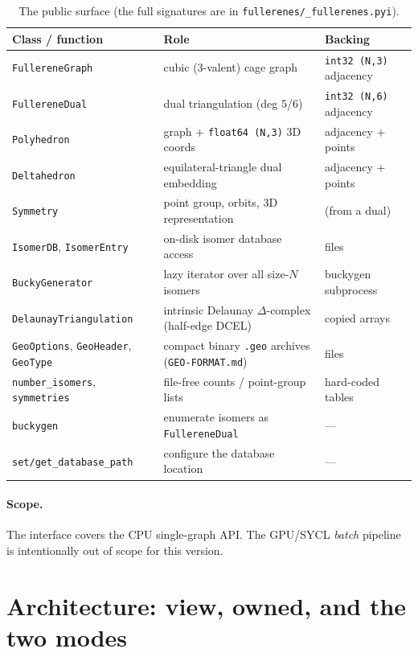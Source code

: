 \documentclass[11pt]{article}
\begin{document}
\begin{table}[h]
\centering\small
\begin{tabular}{@{}lll@{}}
\toprule
Class / function & Role & Backing \\
\midrule
\texttt{FullereneGraph}  & cubic ($3$-valent) cage graph         & \texttt{int32 (N,3)} adjacency \\
\texttt{FullereneDual}   & dual triangulation (deg $5$/$6$)      & \texttt{int32 (N,6)} adjacency \\
\texttt{Polyhedron}      & graph $+$ \texttt{float64 (N,3)} 3D coords & adjacency $+$ points \\
\texttt{Deltahedron}     & equilateral-triangle dual embedding   & adjacency $+$ points \\
\texttt{Symmetry}        & point group, orbits, $3$D representation & (from a dual) \\
\texttt{IsomerDB}, \texttt{IsomerEntry} & on-disk isomer database access & files \\
\texttt{BuckyGenerator}  & lazy iterator over all size-$N$ isomers & buckygen subprocess \\
\texttt{DelaunayTriangulation} & intrinsic Delaunay $\Delta$-complex (half-edge DCEL) & copied arrays \\
\texttt{GeoOptions}, \texttt{GeoHeader}, \texttt{GeoType} & compact binary \texttt{.geo} archives (\texttt{GEO-FORMAT.md}) & files \\
\addlinespace
\texttt{number\_isomers}, \texttt{symmetries} & file-free counts / point-group lists & hard-coded tables \\
\texttt{buckygen}        & enumerate isomers as \texttt{FullereneDual} & --- \\
\texttt{set/get\_database\_path} & configure the database location & --- \\
\bottomrule
\end{tabular}
\caption{The public surface (the full signatures are in \texttt{fullerenes/\_fullerenes.pyi}).}
\label{tab:classes}
\end{table}

\paragraph{Scope.} The interface covers the CPU single-graph API. The GPU/SYCL
\emph{batch} pipeline is intentionally out of scope for this version.

\section{Architecture: view, owned, and the two modes}
\label{sec:arch}
\end{document}
